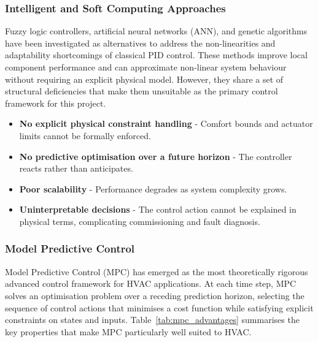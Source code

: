 \documentclass[12pt, a4paper]{article}
\begin{document}
	\subsubsection{Intelligent and Soft Computing Approaches}
	
	Fuzzy logic controllers, artificial neural networks (ANN), and genetic algorithms have been investigated as alternatives to address the non-linearities and adaptability shortcomings of classical PID control. These methods improve local component performance and can approximate non-linear system behaviour without requiring an explicit physical model. However, they share a set of structural deficiencies that make them unsuitable as the primary control framework for this project.
	
	\begin{itemize}
		\item \textbf{No explicit physical constraint handling} - Comfort bounds and actuator limits cannot be formally enforced.
		\item\textbf{ No predictive optimisation over a future horizon }- The controller reacts rather than anticipates.
		\item \textbf{Poor scalability} - Performance degrades as system complexity grows.
		\item \textbf{Uninterpretable decisions} - The control action cannot be explained in physical terms, complicating commissioning and fault diagnosis.
	\end{itemize}
	
	\subsubsection{Model Predictive Control}
	
	Model Predictive Control (MPC) has emerged as the most theoretically rigorous advanced control framework for HVAC applications. At each time step, MPC solves an optimisation problem over a receding prediction horizon, selecting the sequence of control actions that minimises a cost function while satisfying explicit constraints on states and inputs. Table~\ref{tab:mpc_advantages} summarises the key properties that make MPC particularly well suited to HVAC.
	
\end{document}
